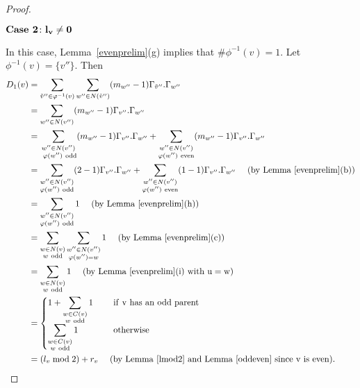 \begin{proof}
 \begin{flushleft} $\textbf{\textup{Case 2}} \colon \mathbf{l_v \neq 0}$ \end{flushleft}
 In this case, Lemma~\ref{evenprelim}(g) implies that $\# \phi^{-1}(v) = 1$. Let $\phi^{-1}(v) = \{ v'' \}$. Then
\begin{align*}
 D_1(v) &= \sum_{\tilde{v}'' \in \phi^{-1}(v)} \sum_{w'' \in N(\tilde{v}'')} (m_{w''} - 1) \Gamma_{\tilde{v}''}.\Gamma_{w''} \\
 &= \sum_{w'' \in N(v'')} (m_{w''} - 1) \Gamma_{v''}.\Gamma_{w''} \\
 &= {\sum_{\substack{w'' \in N(v'') \\ \ \phi(w'') \ \mathrm{odd}}} (m_{w''} - 1) \Gamma_{v''}.\Gamma_{w''}} + {\sum_{\substack{w'' \in N(v'') \\ \phi(w'') \ \mathrm{even}}} (m_{w''} - 1) \Gamma_{v''}.\Gamma_{w''}} \\
 &= {\sum_{\substack{w'' \in N(v'') \\ \phi(w'') \ \mathrm{odd}}} (2 - 1) \Gamma_{v''}.\Gamma_{w''}} + {\sum_{\substack{w'' \in N(v'') \\ \phi(w'') \ \mathrm{even}}} (1 - 1) \Gamma_{v''}.\Gamma_{w''}} \ \ \ \ (\mathrm{by \ Lemma~\ref{evenprelim}(b)}) \\
 &= {\sum_{\substack{w'' \in N(v'') \\ \phi(w'') \ \mathrm{odd}}} 1} \ \ \ \ (\mathrm{by \ Lemma~\ref{evenprelim}(h)}) \\
 &= {\sum_{\substack{w \in N(v) \\ w \ \mathrm{odd}}} \sum_{\substack{w'' \in N(v'') \\ \phi(w'') = w}} 1} \ \ \ \ (\mathrm{by \ Lemma~\ref{evenprelim}(c)}) \\
 &= {\sum_{\substack{w \in N(v) \\ w \ \mathrm{odd}}} 1} \ \ \ \ (\mathrm{by \ Lemma~\ref{evenprelim}(i) \ with \ u=w})\\
 &= \begin{cases} 
 	\displaystyle{1 + {\sum_{\substack{w \in C(v) \\ w \ \mathrm{odd}}} 1}} \ \ \ \ &\mathrm{if \ v \ has \ an \ odd \ parent} \\ 
 	\displaystyle{{\sum_{\substack{w \in C(v) \\ w \ \mathrm{odd}}} 1}} \ \ \ \ &\mathrm{otherwise} 
     \end{cases}  \\
  &= (l_v \bmod 2) + r_v \ \ \ \ (\mathrm{by \ Lemma~\ref{lmod2} \ and \ Lemma~\ref{oddeven} \ since \ v \ is \ even}). \qedhere
\end{align*}  
\end{proof}


